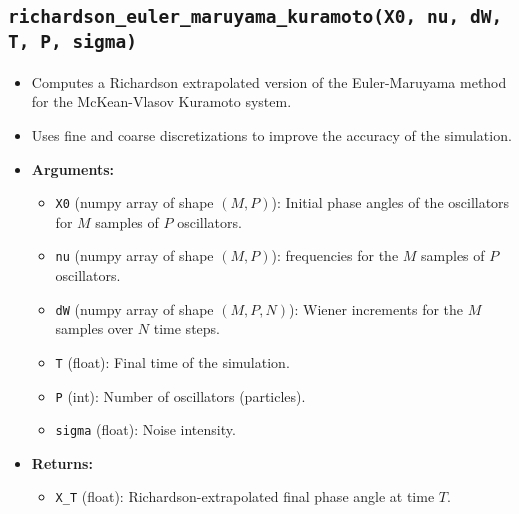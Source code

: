 \documentclass{article}
\begin{document}
\subsection{\texttt{richardson\_euler\_maruyama\_kuramoto(X0, nu, dW, T, P, sigma)}}
\begin{itemize}
    \item Computes a Richardson extrapolated version of the Euler-Maruyama method for the McKean-Vlasov Kuramoto system.
    \item Uses fine and coarse discretizations to improve the accuracy of the simulation.
    \item \textbf{Arguments:}
    \begin{itemize}
        \item \texttt{X0} (numpy array of shape $(M, P)$): Initial phase angles of the oscillators for $M$ samples of $P$ oscillators.
        \item \texttt{nu} (numpy array of shape $(M, P)$):  frequencies for the $M$ samples of $P$ oscillators.
        \item \texttt{dW} (numpy array of shape $(M, P, N)$): Wiener increments for the $M$ samples over $N$ time steps.
        \item \texttt{T} (float): Final time of the simulation.
        \item \texttt{P} (int): Number of oscillators (particles).
        \item \texttt{sigma} (float): Noise intensity.
    \end{itemize}
    \item \textbf{Returns:}
    \begin{itemize}
        \item \texttt{X\_T} (float): Richardson-extrapolated final phase angle at time $T$.
    \end{itemize}
\end{itemize}
\end{document}
